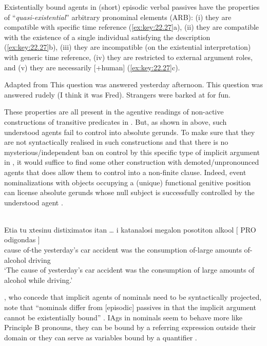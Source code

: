 \documentclass[output=paper]{langsci/langscibook}
\begin{document}
Existentially bound agents in (short) episodic verbal passives have
the properties of  \enquote{\emph{quasi-existential}}
arbitrary pronominal elements (ARB): (i) they are compatible with specific time
reference (\ref{ex:key:22.27}a), (ii) they are compatible with the existence of
a single individual satisfying the description (\ref{ex:key:22.27}b), (iii)
they are incompatible (on the existential interpretation) with generic time
reference, (iv) they are restricted to external argument roles, and (v) they
are necessarily [+human] (\ref{ex:key:22.27}c).

\ea%
    \label{ex:key:22.27} Adapted from \textcite{Roberts2014b}
    \ea This question was answered yesterday afternoon.
    \ex This question was answered rudely (I think it was Fred).
    \ex Strangers were barked at for fun.
    \z
\z

These properties are all present in the agentive readings of non-active
constructions of transitive predicates in . But, as shown in
 above, such understood agents fail to control into absolute
gerunds. To make sure that they are not syntactically realised in such
constructions and that there is no mysterious/independent ban on control by
this specific type of implicit argument in , it would suffice to find some
other construction with de\-mot\-ed/un\-pro\-nounced agents that does allow them to
control into a non-finite clause. Indeed, event nominalizations with objects
occupying a (unique) functional genitive position can license absolute gerunds
whose null subject is successfully controlled by the understood agent
.

\ea%
    \label{ex:key:22.28}\\
    \gll    Etia  tu  xtesinu  distiximatos  itan \dots{} i  katanalosi megalon  posotiton  alkool    [ PRO  odigondas ]\\
            cause   of-the  yesterday’s  {car accident}  was {} the  consumption of-large  amounts  of-alcohol {} {} driving\\
    \glt    \enquote*{The cause of yesterday's car accident was the consumption
    of large amounts of alcohol while driving.}
\z

\citet{AlexiadouEtAl2015}, who concede that implicit agents of nominals need to
be syntactically projected, note that “nominals differ from [episodic] passives
in that the implicit argument cannot be existentially bound”
\parencite[238]{AlexiadouEtAl2015}. \glspl{IAg} in nominals seem to behave more
like Principle B pronouns, they can be bound by a referring expression outside
their  domain or they can serve as variables bound by a quantifier
.
\end{document}
